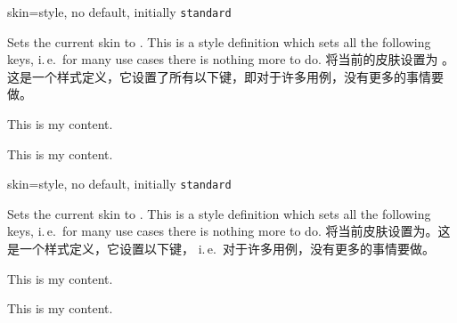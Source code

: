 \begin{docTcbKey}{skin}{=}{style, no default, initially \texttt{standard}}
\begin{stripedbox}
Sets the current skin to . This is a style definition which sets all the following
keys, i.\,e.\ for many use cases there is nothing more to do.
\tcblower
将当前的皮肤设置为 。这是一个样式定义，它设置了所有以下键，即对于许多用例，没有更多的事情要做。
\end{stripedbox}

\begin{dispExample}

\begin{tcolorbox}[adjusted title=adjusted皮肤]
  This is my content.
\end{tcolorbox}
\begin{tcolorbox}[beamer,adjusted title=beamer皮肤]
  This is my content.
\end{tcolorbox}
\end{dispExample}
\end{docTcbKey}

\begin{docTcbKey}{skin}{=}{style, no default, initially \texttt{standard}}
  \begin{stripedbox}
  Sets the current skin to . This is a style definition which sets all the following
  keys, i.\,e.\ for many use cases there is nothing more to do.
  \tcblower
  将当前皮肤设置为。这是一个样式定义，它设置以下键，
  i.\,e.\ 对于许多用例，没有更多的事情要做。
  \end{stripedbox}
  
  \begin{dispExample}
  
  \begin{tcolorbox}[adjusted title=adjusted皮肤]
  This is my content.
  \end{tcolorbox}
  \begin{tcolorbox}[beamer,adjusted title=beamer皮肤]
  This is my content.
  \end{tcolorbox}
  \end{dispExample}
  \end{docTcbKey}

